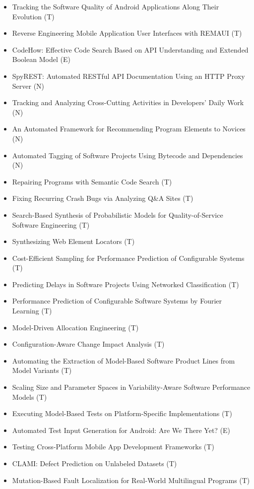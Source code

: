 {\begin{itemize}[itemsep=-1ex]
  \item Tracking the Software Quality of Android Applications Along Their Evolution (T)
  \item Reverse Engineering Mobile Application User Interfaces with REMAUI (T)
  \item CodeHow: Effective Code Search Based on API Understanding and Extended Boolean Model (E)
  \item SpyREST: Automated RESTful API Documentation Using an HTTP Proxy Server (N)
  \item Tracking and Analyzing Cross-Cutting Activities in Developers' Daily Work (N)
  \item An Automated Framework for Recommending Program Elements to Novices (N)
  \item Automated Tagging of Software Projects Using Bytecode and Dependencies (N)
  \item Repairing Programs with Semantic Code Search (T)
  \item Fixing Recurring Crash Bugs via Analyzing Q\&A Sites (T)
  \item Search-Based Synthesis of Probabilistic Models for Quality-of-Service Software Engineering (T)
  \item Synthesizing Web Element Locators (T)
  \item Cost-Efficient Sampling for Performance Prediction of Configurable Systems (T)
  \item Predicting Delays in Software Projects Using Networked Classification (T)
  \item Performance Prediction of Configurable Software Systems by Fourier Learning (T)
  \item Model-Driven Allocation Engineering (T)
  \item Configuration-Aware Change Impact Analysis (T)
  \item Automating the Extraction of Model-Based Software Product Lines from Model Variants (T)
  \item Scaling Size and Parameter Spaces in Variability-Aware Software Performance Models (T)
  \item Executing Model-Based Tests on Platform-Specific Implementations (T)
  \item Automated Test Input Generation for Android: Are We There Yet? (E)
  \item Testing Cross-Platform Mobile App Development Frameworks (T)
  \item CLAMI: Defect Prediction on Unlabeled Datasets (T)
  \item Mutation-Based Fault Localization for Real-World Multilingual Programs (T)

\end{itemize}}
